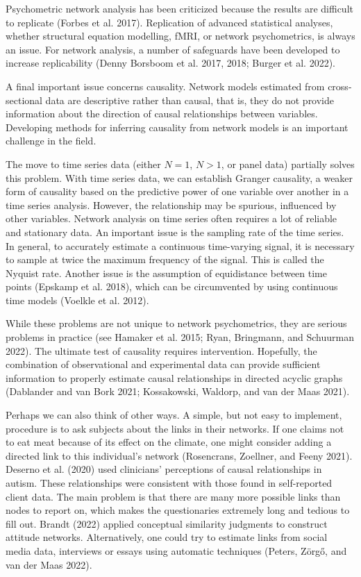 \documentclass[
  a4paper,
  DIV=11,
  numbers=noendperiod,
  oneside]{scrreprt}
\begin{document}
Psychometric network analysis has been criticized because the results
are difficult to replicate (Forbes et al. 2017). Replication of advanced
statistical analyses, whether structural equation modelling, fMRI, or
network psychometrics, is always an issue. For network analysis, a
number of safeguards have been developed to increase replicability
(Denny Borsboom et al. 2017, 2018; Burger et al. 2022).

A final important issue concerns causality. Network models estimated
from cross-sectional data are descriptive rather than causal, that is,
they do not provide information about the direction of causal
relationships between variables. Developing methods for inferring
causality from network models is an important challenge in the field.

The move to time series data (either \(N=1\), \(N>1\), or panel data)
partially solves this problem. With time series data, we can establish
Granger causality, a weaker form of causality based on the predictive
power of one variable over another in a time series analysis. However,
the relationship may be spurious, influenced by other variables. Network
analysis on time series often requires a lot of reliable and stationary
data. An important issue is the sampling rate of the time series. In
general, to accurately estimate a continuous time-varying signal, it is
necessary to sample at twice the maximum frequency of the signal. This
is called the Nyquist rate. Another issue is the assumption of
equidistance between time points (Epskamp et al. 2018), which can be
circumvented by using continuous time models (Voelkle et al. 2012).

While these problems are not unique to network psychometrics, they are
serious problems in practice (see Hamaker et al. 2015; Ryan, Bringmann,
and Schuurman 2022). The ultimate test of causality requires
intervention. Hopefully, the combination of observational and
experimental data can provide sufficient information to properly
estimate causal relationships in directed acyclic graphs (Dablander and
van Bork 2021; Kossakowski, Waldorp, and van der Maas 2021).

Perhaps we can also think of other ways. A simple, but not easy to
implement, procedure is to ask subjects about the links in their
networks. If one claims not to eat meat because of its effect on the
climate, one might consider adding a directed link to this individual's
network (Rosencrans, Zoellner, and Feeny 2021). Deserno et al. (2020)
used clinicians' perceptions of causal relationships in autism. These
relationships were consistent with those found in self-reported client
data. The main problem is that there are many more possible links than
nodes to report on, which makes the questionaries extremely long and
tedious to fill out. Brandt (2022) applied conceptual similarity
judgments to construct attitude networks. Alternatively, one could try
to estimate links from social media data, interviews or essays using
automatic techniques (Peters, Zörgő, and van der Maas 2022).
\end{document}

